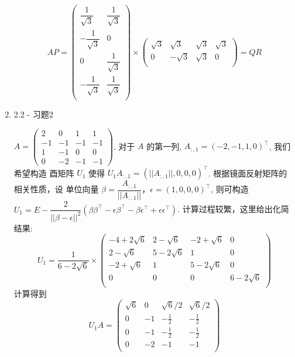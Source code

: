 \documentclass{article}
\begin{document}
\begin{spacing}{1.5}
\begin{enumerate}
    $$
    AP = \left(\begin{array}{cc}
        \dfrac{1}{\sqrt 3} & \dfrac{1}{\sqrt 3}\\
        -\dfrac{1}{\sqrt 3} & 0\\
        0 & \dfrac{1}{\sqrt 3}\\
        -\dfrac{1}{\sqrt 3} & \dfrac{1}{\sqrt 3}\\
    \end{array}\right)
    \times 
    \left(\begin{array}{cccc}
        \sqrt{3} & \sqrt{3} & \sqrt{3} & \sqrt{3}\\
        0 & -\sqrt{3} & \sqrt{3} & 0\\
    \end{array}\right)
    = QR
    $$

    \item 2.2 - 习题2
    
    $A = \left(\begin{array}{cccc}2&0&1&1\\-1&-1&-1&-1\\1&-1&0&0\\0&-2&-1&-1\end{array}\right)$.
    对于 $A$ 的第一列, $A_{:,1} = (-2, -1, 1, 0)^\top$, 我们希望构造 酉矩阵 $U_1$ 使得 $U_1 A_{:,1} = (||A_{:,1}||, 0, 0, 0)^\top$.
    根据镜面反射矩阵的相关性质，设 单位向量 $\beta = \dfrac{A_{:, 1}}{||A_{:,1}||}$，$\epsilon = (1, 0, 0, 0)^\top$, 则可构造 $U_1 = E - \dfrac{2}{||\beta-\epsilon||^2}(\beta\beta^\top - \epsilon\beta^\top - \beta\epsilon^\top + \epsilon\epsilon^\top)$.
    计算过程较繁，这里给出化简结果: $$U_1 = \dfrac{1}{6-2\sqrt{6}}\times
    \left(\begin{array}{cccc}
        -4+2\sqrt{6}&2-\sqrt{6}&-2+\sqrt{6}&0\\
        2-\sqrt{6}&5-2\sqrt{6}&1&0\\
        -2+\sqrt{6}&1&5-2\sqrt{6}&0\\
        0&0&0&6-2\sqrt{6} \\
    \end{array}\right)$$
    计算得到 $$U_1A = \left(\begin{array}{cccc}
        \sqrt{6} & 0 & \sqrt{6}/2 & \sqrt{6}/2\\
        0 & -1 & -\frac{1}{2} & -\frac{1}{2} \\
        0 & -1 & -\frac{1}{2} & -\frac{1}{2} \\
        0 & -2 & -1 & -1 \\
    \end{array}\right)$$


\end{enumerate}
\end{spacing}
\end{document}
